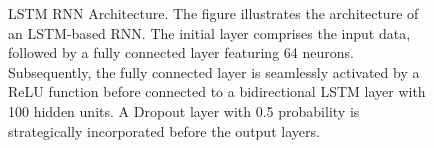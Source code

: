 \begin{figure}[ht]
    \caption{\ac{LSTM} \ac{RNN} Architecture. The figure illustrates the architecture of an LSTM-based  RNN. The initial layer comprises the input data, followed by a fully connected layer featuring 64 neurons. Subsequently, the fully connected layer is seamlessly activated by a \ac{ReLU} function before connected to a bidirectional LSTM layer with 100 hidden units. A Dropout layer with 0.5 probability is strategically incorporated before the output layers. }
    \label{fig:lstmstruct}
\end{figure}
